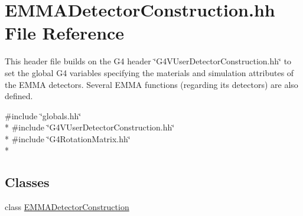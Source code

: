 \hypertarget{EMMADetectorConstruction_8hh}{\section{E\-M\-M\-A\-Detector\-Construction.\-hh File Reference}
\label{EMMADetectorConstruction_8hh}
}


This header file builds on the G4 header \char`\"{}\-G4\-V\-User\-Detector\-Construction.\-hh\char`\"{} to set the global G4 variables specifying the materials and simulation attributes of the E\-M\-M\-A detectors. Several E\-M\-M\-A functions (regarding its detectors) are also defined.  


{\ttfamily \#include \char`\"{}globals.\-hh\char`\"{}}\\*
{\ttfamily \#include \char`\"{}G4\-V\-User\-Detector\-Construction.\-hh\char`\"{}}\\*
{\ttfamily \#include \char`\"{}G4\-Rotation\-Matrix.\-hh\char`\"{}}\\*
\subsection*{Classes}
\begin{DoxyCompactItemize}
\item 
class \hyperlink{classEMMADetectorConstruction}{E\-M\-M\-A\-Detector\-Construction}
\end{DoxyCompactItemize}
